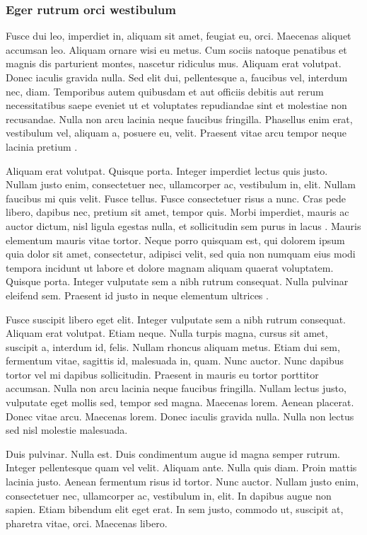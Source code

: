 \subsubsection{Eger rutrum orci westibulum}
Fusce dui leo, imperdiet in, aliquam sit amet, feugiat eu, orci. Maecenas aliquet accumsan leo. Aliquam ornare wisi eu metus. Cum sociis natoque penatibus et magnis dis parturient montes, nascetur ridiculus mus. Aliquam erat volutpat. Donec iaculis gravida nulla. Sed elit dui, pellentesque a, faucibus vel, interdum nec, diam. Temporibus autem quibusdam et aut officiis debitis aut rerum necessitatibus saepe eveniet ut et voluptates repudiandae sint et molestiae non recusandae. Nulla non arcu lacinia neque faucibus fringilla. Phasellus enim erat, vestibulum vel, aliquam a, posuere eu, velit. Praesent vitae arcu tempor neque lacinia pretium
\cite{Walter1999,Svacina1999IEEE,RajmicSysel2002}.

Aliquam erat volutpat. Quisque porta. Integer imperdiet lectus quis justo. Nullam justo enim, consectetuer nec, ullamcorper ac, vestibulum in, elit. Nullam faucibus mi quis velit. Fusce tellus. Fusce consectetuer risus a nunc. Cras pede libero, dapibus nec, pretium sit amet, tempor quis. Morbi imperdiet, mauris ac auctor dictum, nisl ligula egestas nulla, et sollicitudin sem purus in lacus
\cite{CSN_ISO_690-2011,CSN_ISO_7144-1997,CSN_ISO_31-11}.
Mauris elementum mauris vitae tortor. Neque porro quisquam est, qui dolorem ipsum quia dolor sit amet, consectetur, adipisci velit, sed quia non numquam eius modi tempora incidunt ut labore et dolore magnam aliquam quaerat voluptatem. Quisque porta. Integer vulputate sem a nibh rutrum consequat. Nulla pulvinar eleifend sem. Praesent id justo in neque elementum ultrices \cite{BiernatovaSkupa2011:CSNISO690komentar}.

Fusce suscipit libero eget elit. Integer vulputate sem a nibh rutrum consequat. Aliquam erat volutpat. Etiam neque. Nulla turpis magna, cursus sit amet, suscipit a, interdum id, felis. Nullam rhoncus aliquam metus. Etiam dui sem, fermentum vitae, sagittis id, malesuada in, quam. Nunc auctor. Nunc dapibus tortor vel mi dapibus sollicitudin. Praesent in mauris eu tortor porttitor accumsan. Nulla non arcu lacinia neque faucibus fringilla. Nullam lectus justo, vulputate eget mollis sed, tempor sed magna. Maecenas lorem. Aenean placerat. Donec vitae arcu. Maecenas lorem. Donec iaculis gravida nulla. Nulla non lectus sed nisl molestie malesuada.

Duis pulvinar. Nulla est. Duis condimentum augue id magna semper rutrum. Integer pellentesque quam vel velit. Aliquam ante. Nulla quis diam. Proin mattis lacinia justo. Aenean fermentum risus id tortor. Nunc auctor. Nullam justo enim, consectetuer nec, ullamcorper ac, vestibulum in, elit. In dapibus augue non sapien. Etiam bibendum elit eget erat. In sem justo, commodo ut, suscipit at, pharetra vitae, orci. Maecenas libero.

